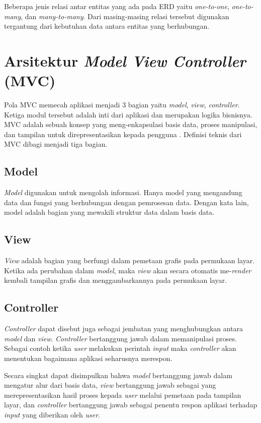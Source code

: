 Beberapa jenis relasi antar entitas yang ada pada ERD yaitu \emph{one-to-one}, \emph{one-to-many}, dan \emph{many-to-many}. Dari masing-masing relasi tersebut digunakan tergantung dari kebutuhan data antara entitas yang berhubungan. 

\section{Arsitektur \emph{Model View Controller} (MVC)}

Pola MVC memecah aplikasi menjadi 3 bagian yaitu \emph{model}, \emph{view}, \emph{controller}. Ketiga modul tersebut adalah inti dari aplikasi dan merupakan logika bisnisnya. MVC adalah sebuah konsep yang meng-enkapsulasi basis data, proses manipulasi, dan tampilan untuk direpresentasikan kepada pengguna \cite{simajuntak}. Definisi teknis dari MVC dibagi menjadi tiga bagian.

\subsection{Model}

\emph{Model} digunakan untuk mengolah informasi. Hanya model yang mengandung data dan fungsi yang berhubungan dengan pemrosesan data. Dengan kata lain, model adalah bagian yang mewakili struktur data dalam basis data.

\subsection{View}

\emph{View} adalah bagian yang berfungi dalam pemetaan grafis pada permukaan layar. Ketika ada perubahan dalam \emph{model}, maka \emph{view} akan secara otomatis me-\emph{render} kembali tampilan grafis dan menggambarkannya pada permukaan layar.

\subsection{Controller}

\emph{Controller} dapat disebut juga sebagai jembatan yang menghubungkan antara \emph{model} dan \emph{view}. \emph{Controller} bertanggung jawab dalam memanipulasi proses. Sebagai contoh ketika \emph{user} melakukan perintah \emph{input} maka \emph{controller} akan menentukan bagaimana aplikasi seharusnya merespon.

Secara singkat dapat disimpulkan bahwa \emph{model} bertanggung jawab dalam mengatur alur dari basis data, \emph{view} bertanggung jawab sebagai yang merepresentasikan hasil proses kepada \emph{user} melalui pemetaan pada tampilan layar, dan \emph{controller} bertanggung jawab sebagai penentu respon aplikasi terhadap \emph{input} yang diberikan oleh \emph{user}.

